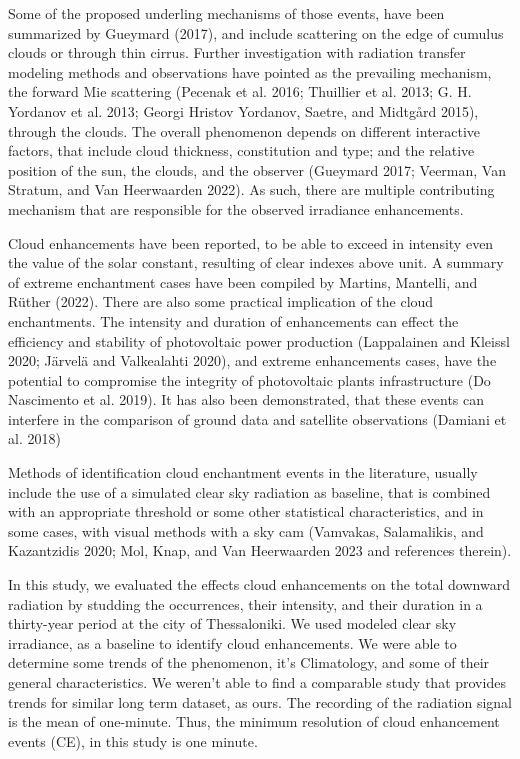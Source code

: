 \documentclass[
]{article}
\begin{document}
Some of the proposed underling mechanisms of those events, have been summarized by
Gueymard (2017), and include scattering on the edge of cumulus clouds or through thin
cirrus. Further investigation with radiation transfer modeling methods and
observations have pointed as the prevailing mechanism, the forward Mie scattering
(Pecenak et al. 2016; Thuillier et al. 2013; G. H. Yordanov et al. 2013; Georgi Hristov Yordanov, Saetre, and Midtgård 2015), through the clouds.
The overall phenomenon depends on different interactive factors, that include cloud
thickness, constitution and type; and the relative position of the sun, the clouds,
and the observer (Gueymard 2017; Veerman, Van Stratum, and Van Heerwaarden 2022). As such, there are multiple
contributing mechanism that are responsible for the observed irradiance enhancements.

Cloud enhancements have been reported, to be able to exceed in intensity even the
value of the solar constant, resulting of clear indexes above unit. A summary of
extreme enchantment cases have been compiled by Martins, Mantelli, and Rüther (2022). There are also some
practical implication of the cloud enchantments. The intensity and duration of
enhancements can effect the efficiency and stability of photovoltaic power production
(Lappalainen and Kleissl 2020; Järvelä and Valkealahti 2020), and extreme enhancements cases, have the
potential to compromise the integrity of photovoltaic plants infrastructure
(Do Nascimento et al. 2019). It has also been demonstrated, that these events can interfere
in the comparison of ground data and satellite observations (Damiani et al. 2018)

Methods of identification cloud enchantment events in the literature, usually include
the use of a simulated clear sky radiation as baseline, that is combined with an
appropriate threshold or some other statistical characteristics, and in some cases,
with visual methods with a sky cam (Vamvakas, Salamalikis, and Kazantzidis 2020; Mol, Knap, and Van Heerwaarden 2023 and references therein).

In this study, we evaluated the effects cloud enhancements on the total downward
radiation by studding the occurrences, their intensity, and their duration in a
thirty-year period at the city of Thessaloniki. We used modeled clear sky
irradiance, as a baseline to identify cloud enhancements. We were able to determine
some trends of the phenomenon, it's Climatology, and some of their general
characteristics. We weren't able to find a comparable study that provides trends for
similar long term dataset, as ours. The recording of the radiation signal is the
mean of one-minute. Thus, the minimum resolution of cloud enhancement events (CE), in
this study is one minute.
\end{document}
